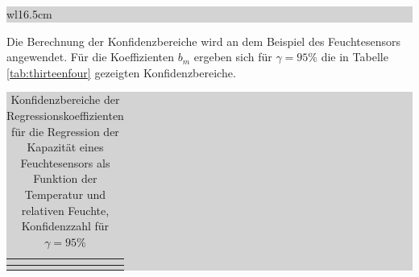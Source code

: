 \clearpage

\noindent
\colorbox{lightgray}{%
%
\renewcommand\arraystretch{0.6}%
\begin{tabular}{ wl{16.5cm} }
{\selectfont
{}}
\end{tabular}%
}\bigskip

\noindent Die Berechnung der Konfidenzbereiche wird an dem Beispiel des Feuchtesensors angewendet. F\"{u}r die Koeffizienten $b_{m}$ ergeben sich f\"{u}r $\gamma = 95\%$  die in Tabelle \ref{tab:thirteenfour} gezeigten Konfidenzbereiche.

\begin{table}[H]
\setlength{\arrayrulewidth}{.1em}
\caption{Konfidenzbereiche der Regressionskoeffizienten f\"{u}r die Regression der Kapazit\"{a}t eines Feuchtesensors als Funktion der Temperatur und relativen Feuchte, Konfidenzzahl f\"{u}r $\gamma = 95 \%$}
\setlength{\fboxsep}{0pt}%
\colorbox{lightgray}{%
%
\begin{tabular}{| c | c | c | c | c | c |}
\hline
\parbox[c][0.7in][c]{0.95in}{\smallskip\centering\textbf{\selectfont{Name}}} & 
\parbox[c][0.7in][c]{0.95in}{\smallskip\centering\textbf{\selectfont{physikalische \\
Größe}}} & 
\parbox[c][0.7in][c]{0.95in}{\smallskip\centering\textbf{}} & 
\parbox[c][0.7in][c]{0.95in}{\smallskip\centering\textbf{}} & 
\parbox[c][0.7in][c]{0.95in}{\smallskip\centering\textbf{\selectfont{Untere \\
Grenze}}} & 
\parbox[c][0.7in][c]{0.95in}{\smallskip\centering\textbf{\selectfont{Obere \\
Grenze}}}\\ \hline

\parbox[c][0.3in][c]{0.95in}{} &
\parbox[c][0.3in][c]{0.95in}{} &
\parbox[c][0.3in][c]{0.95in}{} &
\parbox[c][0.3in][c]{0.95in}{} &
\parbox[c][0.3in][c]{0.95in}{} &
\parbox[c][0.3in][c]{0.95in}{}\\ \hline


\end{tabular}}
\end{table}
